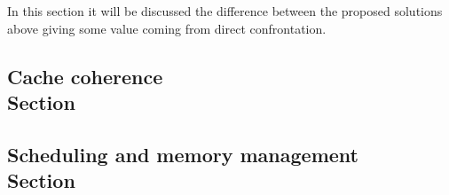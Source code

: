 \documentclass[a4paper,10pt]{article}
\begin{document}
\begin{multicols}{2}
In this section it will be discussed the difference between the proposed solutions above giving some value coming from direct confrontation.

\subsection{Cache coherence \\ Section}


\subsection{Scheduling and memory management \\ Section}





\end{multicols}
\end{document}
